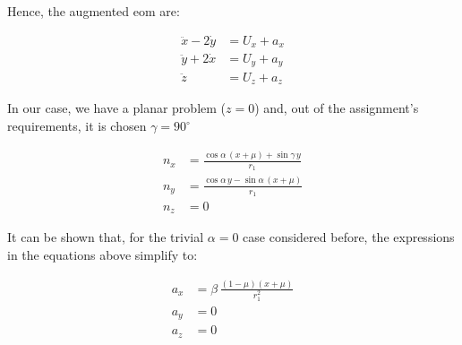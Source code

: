 Hence, the augmented \ac{eom} are:

\begin{align}
\ddot{x} - 2\dot{y} &= U_x + a_x \\
\ddot{y} + 2\dot{x} &= U_y + a_y \\
\ddot{z} &= U_z + a_z
\end{align}

In our case, we have a planar problem ($z=0$) and, out of the assignment's requirements, it is chosen $\gamma = 90^{\circ}$

\begin{align}
n_x &= \frac{\cos\alpha\,(x+\mu) + \sin\gamma\, y}{r_1} \\
n_y &= \frac{\cos\alpha\, y - \sin\alpha\,(x+\mu)}{r_1} \\
n_z &= 0
\end{align}

It can be shown that, for the trivial $\alpha = 0$ case considered before, the expressions in the equations above simplify to:

\begin{align}
a_x &= \beta \,\frac{(1-\mu) (x+\mu)}{r_1^2} \\
a_y &= 0 \\
a_z &= 0
\end{align}